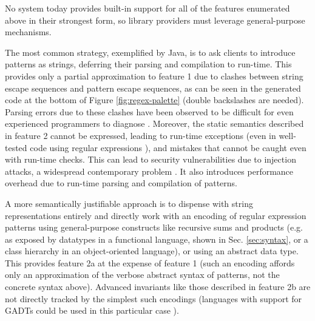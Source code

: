 No system today provides built-in support for all of the features enumerated above in their strongest form, so library providers must leverage  general-purpose mechanisms. %

The most common strategy, exemplified by Java, is to ask clients to introduce patterns as strings, deferring their  parsing and compilation to run-time. This provides only a partial approximation to feature 1 due to clashes between string escape sequences and pattern escape sequences, as can be seen in the generated code at the bottom of Figure \ref{fig:regex-palette} (double backslashes are needed). Parsing errors due to these clashes have been observed to be difficult for even experienced programmers to diagnose \cite{Omar:2012:ACC:2337223.2337324}. Moreover, the static semantics described in feature 2 cannot be expressed, leading to run-time exceptions (even in well-tested code using regular expressions \cite{spishak2012type}), and mistakes that cannot be  caught even with run-time checks. This can lead to security vulnerabilities due to injection attacks, a widespread contemporary problem \cite{owasp2013}. It also introduces performance overhead due to run-time parsing and compilation of patterns.  


A more semantically justifiable approach is to dispense with string representations entirely and directly work with an encoding of regular expression patterns using  general-purpose constructs like recursive sums and  products (e.g. as exposed by datatypes in a functional language, shown in Sec. \ref{sec:syntax}, or a class hierarchy in an object-oriented language), or using an abstract data type. This provides feature 2a at the expense of feature 1 (such an encoding affords only an approximation of the verbose abstract syntax of patterns, not the concrete syntax above). Advanced invariants like those described in feature 2b are not directly tracked by the simplest such encodings (languages with support for GADTs could be used in this particular case \cite{XiCheChe03}).%

